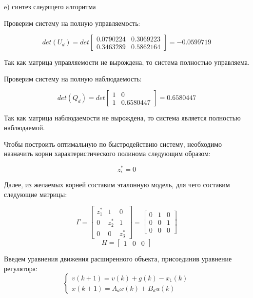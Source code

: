 \documentclass[a4paper,14pt]{extreport}
\begin{document}
e) синтез следящего алгоритма

Проверим систему на полную управляемость:

\begin{equation}
	det(U_d) = det
	\begin{bmatrix}
	0.0790224 &   0.3069223\\  
	0.3463289  &  0.5862164 
	\end{bmatrix}
	=
	 - 0.0599719 
\end{equation}

Так как матрица управляемости не вырождена, то система полностью управляема.

Проверим систему на полную наблюдаемость:

\begin{equation}
det(Q_d) = det
\begin{bmatrix}
1&    0\\         
1  &  0.6580447 
\end{bmatrix}
=
0.6580447  
\end{equation}

Так как матрица наблюдаемости не вырождена, то система является полностью наблюдаемой.

Чтобы построить оптимальную по быстродействию систему, необходимо назначить корни характеристического полинома следующим образом:

\begin{equation}
	z_i^* = 0
\end{equation}

Далее, из желаемых корней составим эталонную модель, для чего составим следующие матрицы:

\begin{equation}
\Gamma = 
\begin{bmatrix}
z^*_1 & 1 & 0\\
0 & z^*_2 & 1\\
0 & 0 & z^*_3
\end{bmatrix}
=
\begin{bmatrix}
0&1&0\\
0&0&1\\
0&0&0
\end{bmatrix}
\end{equation}
\begin{equation}
	H =
	\begin{bmatrix}
	1&0&0
	\end{bmatrix}
\end{equation}

Введем уравнения движения расширенного объекта, присоединив уравнение регулятора:
\begin{equation}
	\begin{cases}
	v(k+1) = v(k) + g(k) - x_1 (k)\\
	x(k+1) = A_d x(k) + B_d u(k)
	\end{cases}
\end{equation}
\end{document}
